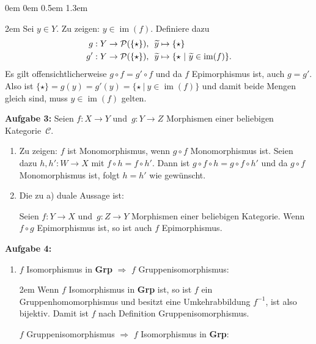 \documentclass[a4paper,ngerman]{scrartcl}
\theoremstyle{definition}
\theoremstyle{plain}
\theoremstyle{remark}
\newcommand{\C}{\mathcal{C}}
\DeclareMathOperator{\Bild}{im}
\begin{document}
\begin{list}{}{0em \leftmargin0em \itemindent0.5em \itemsep 1.3em}
\begin{enumerate}
  \begin{addmargin}{2em}
    Sei $y \in Y$. Zu zeigen: $y \in \Bild(f)$. Definiere dazu
    \begin{align*}
      g&:Y \to \mathcal{P}(\{\star\}), \enskip\widetilde{y} \mapsto \{\star\} \\
      g'&:Y \to \mathcal{P}(\{\star\}), \enskip\widetilde{y} \mapsto \{\star~|~\widetilde{y} \in \Bild(f) \}.
    \end{align*}
    Es gilt offensichtlicherweise $g \circ f = g' \circ f$ und da $f$ Epimorphismus ist,
    auch $g = g'$. Also ist $\{\star\} = g(y) = g'(y) = \{\star~|~y \in \Bild(f)\}$ und damit beide Mengen gleich sind, muss $y \in \Bild(f)$ gelten.
  \end{addmargin}
\end{enumerate}

\item[\textbf{Aufgabe 3:}]
Seien $f:X \to Y$ und~$g:Y \to Z$ Morphismen einer beliebigen Kategorie~$\C$.
\begin{enumerate}
\item Zu zeigen: $f$ ist Monomorphismus, wenn $g \circ f$ Monomorphismus ist.
  Seien dazu $h, h' : W \to X$ mit $f \circ h = f \circ h'$. Dann ist 
  $g \circ f \circ h = g \circ f \circ h'$ und da $g \circ f$ Monomorphismus ist,
  folgt $h = h'$ wie gewünscht.
\item Die zu a) duale Aussage ist:

  Seien $f:Y \to X$ und~$g:Z \to Y$ Morphismen einer beliebigen Kategorie. Wenn $f \circ g$ Epimorphismus ist, so ist auch $f$ Epimorphismus.
\end{enumerate}


\item[\textbf{Aufgabe 4:}]\mbox{}
\begin{enumerate}
\item $f$ Isomorphismus in \textbf{Grp} $\Rightarrow$ $f$ Gruppenisomorphismus:

    \begin{addmargin}{2em}
      Wenn $f$ Isomorphismus in \textbf{Grp} ist, so ist $f$ ein Gruppenhomomorphismus und besitzt eine Umkehrabbildung $f^{-1}$, ist also bijektiv. Damit ist $f$ nach Definition Gruppenisomorphismus.
    \end{addmargin}

  $f$ Gruppenisomorphismus $\Rightarrow$ $f$ Isomorphismus in \textbf{Grp}:


\end{enumerate}
\end{list}
\end{document}
